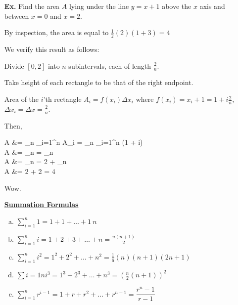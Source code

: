 \documentclass{letter}
\begin{document}
	\begin{itemize}
		\item[\textbf{Ex. }] Find the area $A$ lying under the line $y = x + 1$ above the $x$ axis and between $x=0$ and $x=2$.
		
		By inspection, the area is equal to $\frac{1}{2}(2)(1+3) = 4$
		
		We verify this result as follows:
		
		Divide $[0, 2]$ into $n$ subintervals, each of length $\frac{2}{n}$.
		
		Take height of each rectangle to be that of the right endpoint.
		
		Area of the $i$'th rectangle $A_i = f(x_i)\Delta x_i$ where $f(x_i) = x_i + 1 = 1 + i \frac{2}{n}$, $\Delta x_i = \Delta x = \frac{2}{n}$.
		
		Then,
		\begin{flalign*}
			A &= \lim_{n \to \infty} \sum_{i=1}^{n} A_i = \lim_{n \to \infty} \sum_{i=1}^{n} \frac{2}{n}(1 + i)\\ 
			A &= \lim_{n \to \infty} \bigg[ \sum_{i=1}^{n}  + i \frac{4}{n^2} \bigg] = \lim_{n \to \infty} \bigg[ \frac{2}{n} \sum_{i=1}^{n} 1 + \frac{4}{n^2} \sum_{i=1}^{n} i \bigg]\\
			A &= \lim_{n \to \infty}  = 2 + \lim_{n \to \infty} \\
			A &= 2 + 2 = 4 
		\end{flalign*}
		
		Wow.
		
		\underline{\textbf{Summation Formulas}}
		\begin{enumerate}[a)]
			\item $ \displaystyle \sum_{i=1}^n 1 = 1 + 1 + \dots + 1 \ n$
			\item $ \displaystyle \sum_{i=1}^n i = 1 + 2 + 3 + \dots + n = \frac{n(n+1)}{2}$
			\item $ \displaystyle \sum_{i=1}^{n} i^2 = 1^2 + 2^2 + \dots + n^2 = \frac{1}{6} (n)(n+1)(2n + 1)$
			\item $ \displaystyle \sum{i=1}{n} i^3 = 1^3 + 2^3 + \dots + n^3 = (\frac{n}{2}(n+1))^2$
			\item $\sum_{i=1}^n r^{i-1} = 1 + r + r^2 + \dots + r^{n-1} = \dfrac{r^n - 1}{r-1}$
		\end{enumerate}
	\end{itemize}
\end{document}
